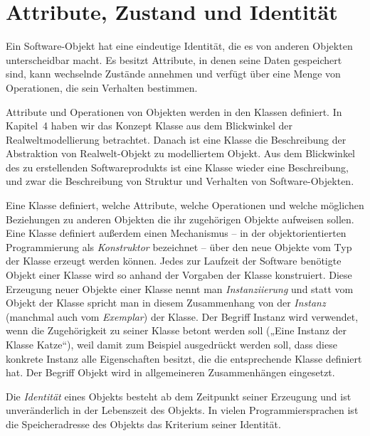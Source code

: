 \section{Attribute, Zustand und Identität}
\label{sec:Kap-8.1}

Ein Software-Objekt 
hat eine eindeutige Identität, die es von anderen Objekten unterscheidbar macht. Es besitzt Attribute, in denen seine Daten gespeichert sind, kann wechselnde Zustände annehmen und verfügt über eine Menge von Operationen, die sein Verhalten bestimmen. 

\vspace{2mm} %

Attribute und Operationen von Objekten werden in den Klassen 
definiert. In Kapitel~4 haben wir das Konzept Klasse aus dem Blickwinkel der Realweltmodellierung betrachtet. Danach ist eine Klasse die Beschreibung der Abstraktion von Realwelt-Objekt zu modelliertem Objekt. Aus dem Blickwinkel des zu erstellenden Softwareprodukts ist eine Klasse wieder eine Beschreibung, und zwar die Beschreibung von Struktur und Verhalten von Software-Objekten. 

\vspace{2mm} %

Eine Klasse definiert, welche Attribute, welche Operationen und welche möglichen Beziehungen zu anderen Objekten die ihr zugehörigen Objekte aufweisen sollen. Eine Klasse definiert außerdem einen Mechanismus – in der objektorientierten Programmierung als \textit{Konstruktor} bezeichnet – über den neue Objekte vom Typ der Klasse erzeugt werden können. Jedes zur Laufzeit der Software benötigte Objekt einer Klasse wird so anhand der Vorgaben der Klasse konstruiert. Diese Erzeugung neuer Objekte einer Klasse nennt man \textit{Instanziierung} und statt vom Objekt der Klasse spricht man in diesem Zusammenhang von der \textit{Instanz}
(manchmal auch vom \textit{Exemplar}) der Klasse. Der Begriff Instanz wird verwendet, wenn die Zugehörigkeit zu seiner Klasse betont werden soll („Eine Instanz der Klasse Katze“), weil damit zum Beispiel ausgedrückt werden soll, dass diese konkrete Instanz alle Eigenschaften besitzt, die die entsprechende Klasse definiert hat. Der Begriff Objekt wird in allgemeineren Zusammenhängen eingesetzt. 

\vspace{2mm} %

Die \textit{Identität}
eines Objekts besteht ab dem Zeitpunkt seiner Erzeugung und ist unveränderlich in der Lebenszeit des Objekts. In vielen Programmiersprachen ist die Speicheradresse des Objekts das Kriterium seiner Identität. 


